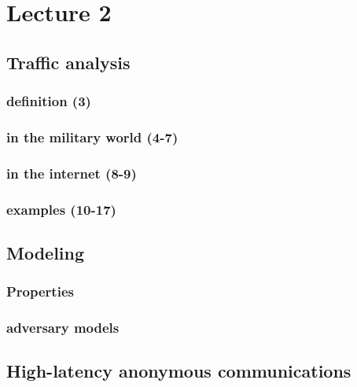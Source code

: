\documentclass[../overview.tex]{subfiles}
\begin{document}
\section{Lecture 2}
\subsection{Traffic analysis}
\subsubsection{definition (3)}
\subsubsection{in the military world (4-7)}
\subsubsection{in the internet (8-9)}
\subsubsection{examples (10-17)}

\subsection{Modeling}
\subsubsection{Properties}
\subsubsection{adversary models}

\subsection{High-latency anonymous communications}
\end{document}
